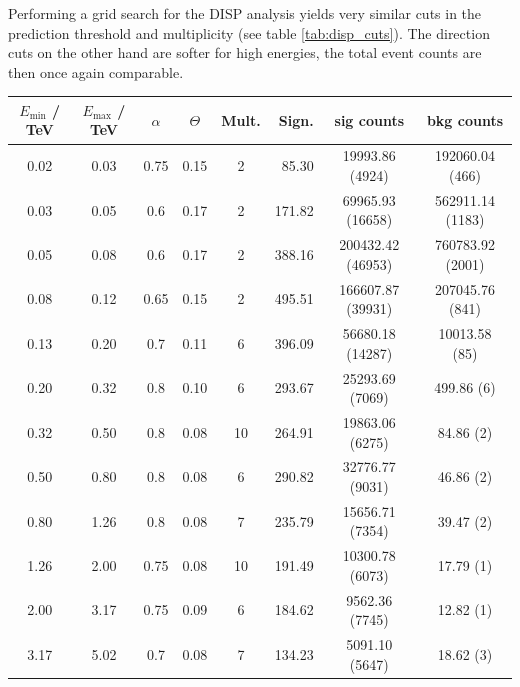 Performing a grid search for the DISP analysis yields very similar cuts
in the prediction threshold and multiplicity (see table \ref{tab:disp_cuts}).
The direction cuts on the other hand are softer for high energies,
the total event counts are then once again comparable.

\newpage
{}
\recalctypearea
    \centering
    \begin{tabular}{c c c c c r c c}
        $E_\text{min}$ / \si{\tera\electronvolt} & $E_\text{max}$ / \si{\tera\electronvolt} & $\alpha$ & $\Theta$ & Mult. & Sign. & sig counts & bkg counts \\
        \hline
        \num{0.02} & \num{0.03} & 0.75 & 0.15 & 2 & \num{85.30} & \num{19993.86} (\num{4924}) & \num{192060.04} (\num{466})\\
        \num{0.03} & \num{0.05} & 0.6 & 0.17 & 2 & \num{171.82} & \num{69965.93} (\num{16658}) & \num{562911.14} (\num{1183}) \\
        \num{0.05} & \num{0.08} & 0.6 & 0.17 & 2 & \num{388.16} & \num{200432.42} (\num{46953}) & \num{760783.92} (\num{2001}) \\
        \num{0.08} & \num{0.12} & 0.65 & 0.15 & 2 & \num{495.51} & \num{166607.87} (\num{39931}) & \num{207045.76} (\num{841}) \\
        \num{0.13} & \num{0.20} & 0.7 & 0.11 & 6 & \num{396.09} & \num{56680.18} (\num{14287}) & \num{10013.58} (\num{85}) \\
        \num{0.20} & \num{0.32} & 0.8 & 0.10 & 6 & \num{293.67} & \num{25293.69} (\num{7069}) & \num{499.86} (\num{6}) \\
        \num{0.32} & \num{0.50} & 0.8 & 0.08 & 10 & \num{264.91} & \num{19863.06} (\num{6275}) & \num{84.86} (\num{2}) \\
        \num{0.50} & \num{0.80} & 0.8 & 0.08 & 6 & \num{290.82} & \num{32776.77} (\num{9031}) & \num{46.86} (\num{2}) \\
        \num{0.80} & \num{1.26} & 0.8 & 0.08 & 7 & \num{235.79} & \num{15656.71} (\num{7354}) & \num{39.47} (\num{2}) \\
        \num{1.26} & \num{2.00} & 0.75 & 0.08 & 10 & \num{191.49} & \num{10300.78} (\num{6073}) & \num{17.79} (\num{1}) \\
        \num{2.00} & \num{3.17} & 0.75 & 0.09 & 6 & \num{184.62} & \num{9562.36} (\num{7745}) & \num{12.82} (\num{1}) \\
        \num{3.17} & \num{5.02} & 0.7 & 0.08 & 7 & \num{134.23} & \num{5091.10} (\num{5647}) & \num{18.62} (\num{3}) \\

\end{tabular}
